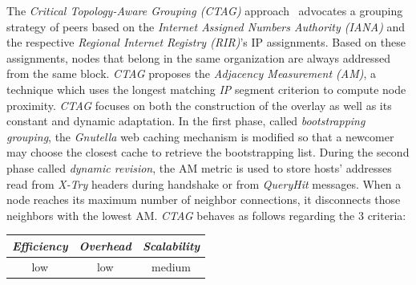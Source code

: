 The \emph{Critical Topology-Aware Grouping (CTAG)} approach~\cite{ZL2006}
advocates a grouping strategy of peers based on the 
\emph{Internet Assigned Numbers Authority (IANA)} and 
the respective \emph{Regional Internet Registry (RIR)}'s IP assignments.
Based on these assignments, nodes that belong in the same 
organization are always addressed from the same block.
\emph{CTAG} proposes the \emph{Adjacency Measurement (AM)}, 
a technique which uses the longest
matching \emph{IP} segment criterion to compute node proximity. 
\emph{CTAG} focuses on both
the construction of the overlay as well as its 
constant and dynamic adaptation.
In the first phase, called \emph{bootstrapping grouping}, 
the {\sl Gnutella} web caching mechanism is modified 
so that a newcomer may choose the closest %
cache to retrieve the bootstrapping list. 
During the second phase called \emph{dynamic revision}, 
the AM metric is used to store hosts' 
addresses read from \emph{X-Try} headers during handshake or from
\emph{QueryHit} messages. 
When a node reaches its maximum number of neighbor
connections, it disconnects those neighbors with the lowest AM.
\emph{CTAG} behaves as follows regarding the $3$ criteria:
\begin{center}
{\footnotesize
\begin{tabular}{ccc}
\emph{Efficiency} & \emph{Overhead} & \emph{Scalability} \\
\hline
low &
low &
medium
\end{tabular}
}
\end{center}

